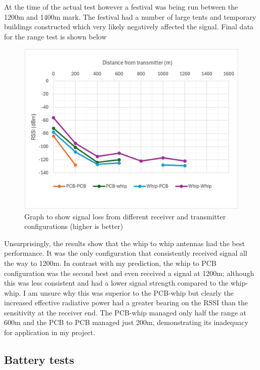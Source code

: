 At the time of the actual test however a festival was being run between the
1200m and 1400m mark. The festival had a number of large tents and temporary
buildings constructed which very likely negatively affected the signal. Final
data for the range test is shown below

\begin{figure}[H]
    \centering
    \includegraphics[width=1\textwidth]{contents/part-2/fig2/distance-graph.jpg}
    \caption{Graph to show signal loss from different receiver and transmitter configurations (higher is better)}
    \label{fig:range-test-graph}
\end{figure}

Unsurprisingly, the results show that the whip to whip antennas had the best
performance. It was the only configuration that consistently received signal all
the way to 1200m. In contrast with my prediction, the whip to PCB configuration
was the second best and even received a signal at 1200m; although this was less
consistent and had a lower signal strength compared to the whip-whip. I am
unsure why this was superior to the PCB-whip but clearly the increased effective
radiative power had a greater bearing on the RSSI than the sensitivity at the
receiver end. The PCB-whip managed only half the range at 600m and the PCB to
PCB managed just 200m, demonstrating its inadequacy for application in my
project.

\subsection{Battery tests}

